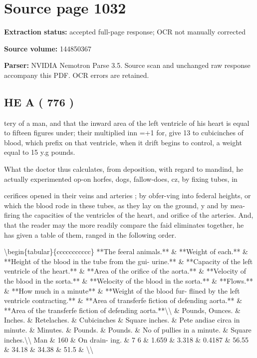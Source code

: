 \clearpage
\section{Source page 1032}
\textbf{Extraction status:} accepted full-page response; OCR not manually corrected\par
\textbf{Source volume:} 144850367\par
\textbf{Parser:} NVIDIA Nemotron Parse 3.5. Source scan and unchanged raw response accompany this PDF. OCR errors are retained.\par\medskip
\subsection*{HE A ( 776 )}
tery of a man, and that the inward area of the left ventricle of his heart is equal to fifteen figures under; their multiplied inn =+1 for, give 13 to cubicinches of blood, which prefix on that ventricle, when it drift begins to control, a weight equal to 15 y.g pounds.\par\medskip
What the doctor thus calculates, from deposition, with regard to mandind, he actually experimented op-on horfes, dogs, fallow-does, cz, by fixing tubes, in\par\medskip
cerifices opened in their veins and arteries ; by obfer-ving into federal heights, or which the blood rode in these tubes, as they lay on the ground, y and by mea- firing the capacities of the ventricles of the heart, and orifice of the arteries. And, that the reader may the more readily compare the faid eliminates together, he has given a table of them, ranged in the following order.\par\medskip
\textbackslash{}begin\{tabular\}\{ccccccccccc\}
**The feeral animals.** \& **Weight of each.** \& **Height of the blood in the tube from the gui- urine.** \& **Capacity of the left ventricle of the heart.** \& **Area of the orifice of the aorta.** \& **Velocity of the blood in the sorta.** \& **Welocity of the blood in the sorta.** \& **Flows.** \& **How much in a minute** \& **Weight of the blood fur- flined by the left ventricle contracting.** \& **Area of transferfe fiction of defending aorta.** \& **Area of the transferfe fiction of defending aorta.**\textbackslash{}\textbackslash{}
 \& Pounds, Ounces. \& Inches. \& Retelaches. \& Cubicinches \& Square inches. \& Pete andiae circa in minute. \& Minutes. \& Pounds. \& Pounds. \& No of pullies in a minute. \& Square inches.\textbackslash{}\textbackslash{}
Man \& 160 \& On drain- ing. \& 7 6 \& 1.659 \& 3.318 \& 0.4187 \& 56.55 \& 34.18 \& 34.38 \& 51.5 \& \textbackslash{}\textbackslash{}
